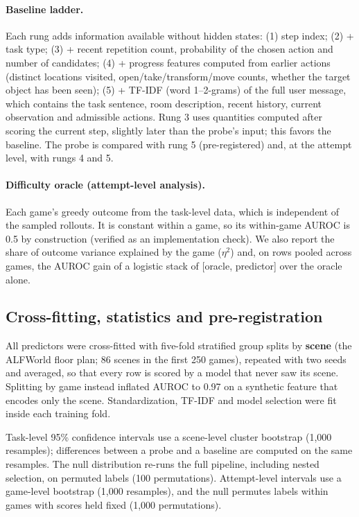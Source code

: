 \documentclass[11pt]{article}
\begin{document}
\paragraph{Baseline ladder.} Each rung adds information available without hidden states:
(1) step index; (2) + task type; (3) + recent repetition count, probability of the chosen action and number of candidates;
(4) + progress features computed from earlier actions (distinct locations visited, open/take/transform/move counts, whether the target object has been seen);
(5) + TF-IDF (word 1--2-grams) of the full user message, which contains the task sentence, room description, recent history, current observation and admissible actions.
Rung 3 uses quantities computed after scoring the current step, slightly later than the probe's input; this favors the baseline.
The probe is compared with rung 5 (pre-registered) and, at the attempt level, with rungs 4 and 5.

\paragraph{Difficulty oracle (attempt-level analysis).} Each game's greedy outcome from the task-level data, which is independent of the sampled rollouts.
It is constant within a game, so its within-game AUROC is 0.5 by construction (verified as an implementation check).
We also report the share of outcome variance explained by the game ($\eta^2$) and, on rows pooled across games, the AUROC gain of a logistic stack of [oracle, predictor] over the oracle alone.

\subsection{Cross-fitting, statistics and pre-registration}\label{sec:stats}
All predictors were cross-fitted with five-fold stratified group splits by \textbf{scene} (the ALFWorld floor plan; 86 scenes in the first 250 games),
repeated with two seeds and averaged, so that every row is scored by a model that never saw its scene. Splitting by game instead inflated AUROC to 0.97
on a synthetic feature that encodes only the scene. Standardization, TF-IDF and model selection were fit inside each training fold.

Task-level 95\% confidence intervals use a scene-level cluster bootstrap (1,000 resamples); differences between a probe and a baseline are computed on the same resamples.
The null distribution re-runs the full pipeline, including nested selection, on permuted labels (100 permutations).
Attempt-level intervals use a game-level bootstrap (1,000 resamples), and the null permutes labels within games with scores held fixed (1,000 permutations).
\end{document}
